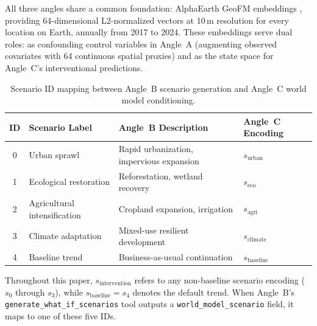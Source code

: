 \documentclass{article}
\begin{document}
All three angles share a common foundation: AlphaEarth GeoFM embeddings \citep{brown2025alphaearth}, providing 64-dimensional L2-normalized vectors at 10\,m resolution for every location on Earth, annually from 2017 to 2024. These embeddings serve dual roles: as confounding control variables in Angle~A (augmenting observed covariates with 64 continuous spatial proxies) and as the state space for Angle~C's interventional predictions.

\begin{table}[htbp]
\centering
\caption{Scenario ID mapping between Angle~B scenario generation and Angle~C world model conditioning.}
\label{tab:scenario_mapping}
\begin{tabular}{clll}
\toprule
ID & Scenario Label & Angle~B Description & Angle~C Encoding \\
\midrule
0 & Urban sprawl & Rapid urbanization, impervious expansion & $s_{\text{urban}}$ \\
1 & Ecological restoration & Reforestation, wetland recovery & $s_{\text{eco}}$ \\
2 & Agricultural intensification & Cropland expansion, irrigation & $s_{\text{agri}}$ \\
3 & Climate adaptation & Mixed-use resilient development & $s_{\text{climate}}$ \\
4 & Baseline trend & Business-as-usual continuation & $s_{\text{baseline}}$ \\
\bottomrule
\end{tabular}
\end{table}

Throughout this paper, $s_{\text{intervention}}$ refers to any non-baseline scenario encoding ($s_0$ through $s_3$), while $s_{\text{baseline}} = s_4$ denotes the default trend. When Angle~B's \texttt{generate\_what\_if\_scenarios} tool outputs a \texttt{world\_model\_scenario} field, it maps to one of these five IDs.
\end{document}
